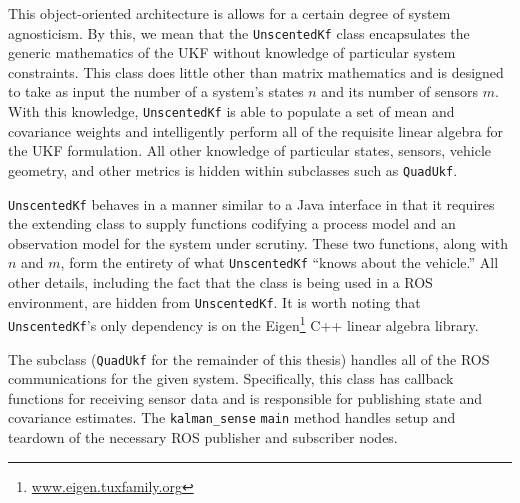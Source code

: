 This object-oriented architecture is allows for a certain degree of system agnosticism. By this, we mean that the \texttt{UnscentedKf} class encapsulates the generic mathematics of the UKF without knowledge of particular system constraints. This class does little other than matrix mathematics and is designed to take as input the number of a system's states $n$ and its number of sensors $m$. With this knowledge, \texttt{UnscentedKf} is able to populate a set of mean and covariance weights and intelligently perform all of the requisite linear algebra for the UKF formulation. All other knowledge of particular states, sensors, vehicle geometry, and other metrics is hidden within subclasses such as \texttt{QuadUkf}.

\texttt{UnscentedKf} behaves in a manner similar to a Java interface in that it requires the extending class to supply functions codifying a process model and an observation model for the system under scrutiny. These two functions, along with $n$ and $m$, form the entirety of what \texttt{UnscentedKf} ``knows about the vehicle.'' All other details, including the fact that the class is being used in a ROS environment, are hidden from \texttt{UnscentedKf}. It is worth noting that \texttt{UnscentedKf}'s only dependency is on the Eigen\footnote{\url{www.eigen.tuxfamily.org}} C++ linear algebra library.

The subclass (\texttt{QuadUkf} for the remainder of this thesis) handles all of the ROS communications for the given system. Specifically, this class has callback functions for receiving sensor data and is responsible for publishing state and covariance estimates. The \texttt{kalman\_sense} \texttt{main} method handles setup and teardown of the necessary ROS publisher and subscriber nodes.

